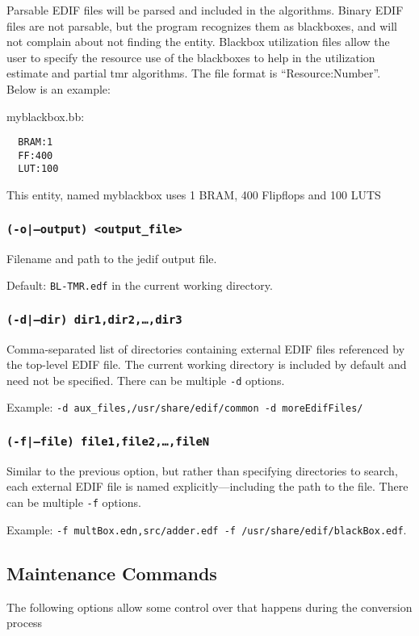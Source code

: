 Parsable EDIF files will be parsed and included in the algorithms.
Binary EDIF files are not parsable, but the program recognizes them as
blackboxes, and will not complain about not finding the entity.
Blackbox utilization files allow the user to specify the resource use
of the blackboxes to help in the utilization estimate and partial tmr
algorithms.  The file format is ``Resource:Number''.  Below is an
example:

myblackbox.bb:\\
\begin{verbatim}
  BRAM:1
  FF:400
  LUT:100
\end{verbatim}

This entity, named myblackbox uses 1 BRAM, 400 Flipflops and 100 LUTS

\subsubsection{\texttt{(-o|--output) <output\_file>}}
Filename and path to the jedif output file.

Default: \texttt{BL-TMR.edf} in the current working directory.

\subsubsection{\texttt{(-d|--dir) dir1,dir2,\ldots,dir3}}
Comma-separated list of directories containing external EDIF files referenced 
by the top-level EDIF file. The current working directory is included by 
default and need not be specified. There can be multiple \texttt{-d} options.

Example: \texttt{-d aux\_files,/usr/share/edif/common -d
  moreEdifFiles/}

\subsubsection{\texttt{(-f|--file) file1,file2,\ldots,fileN}}
Similar to the previous option, but rather than specifying directories to 
search, each external EDIF file is named explicitly---including the path to the 
file. There can be multiple \texttt{-f} options. 

Example: \texttt{-f multBox.edn,src/adder.edf -f /usr/share/edif/blackBox.edf}.

\subsection{Maintenance Commands}
The following options allow some control over that happens during the 
conversion process
  
